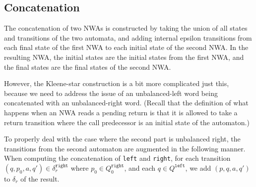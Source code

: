 \subsection{Concatenation}
\label{Se:Concatenation}

The concatenation of two NWAs is constructed by taking the union of all
states and transitions of the two automata, and adding
internal epsilon transitions from each final state of the first NWA to each
initial state of the second NWA.  In the resulting NWA, the initial states
are the initial states from the first NWA, and the final states are the final
states of the second NWA.

However, the Kleene-star construction is a bit more complicated just this,
because we need to address the issue of an unbalanced-left
word being concatenated with an unbalanced-right word.  (Recall that the
definition of what happens when an NWA reads a pending return is that it is
allowed to take a return transition where the call predecessor is an initial
state of the automaton.) 

To properly deal with the case where the second part is unbalanced
right, the transitions from the second automaton are augmented in the
following manner. When computing the concatenation of \texttt{left} and
\texttt{right}, for each transition $(q, p_0, a, q')
\in\delta_r^{\texttt{right}}$ where $p_0 \in Q_0^\texttt{right}$, and each $q
\in Q^\texttt{left}$, we add $(p, q, a, q')$ to $\delta_r$ of the result.



